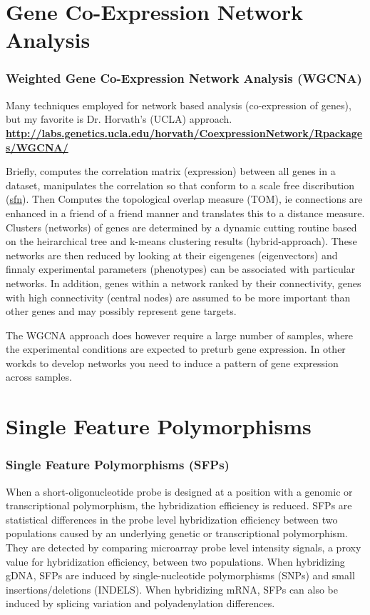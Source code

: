 \documentclass[pdf]{beamer}
\begin{document}
\section{Gene Co-Expression Network Analysis}

\begin{frame}[allowframebreaks]
	\frametitle{Weighted Gene Co-Expression Network Analysis (WGCNA)}

Many techniques employed for network based analysis (co-expression of genes), but my favorite is Dr. Horvath's (UCLA) approach.\\
\textbf{\url{http://labs.genetics.ucla.edu/horvath/CoexpressionNetwork/Rpackages/WGCNA/}}
\vspace{0.1in}

Briefly, computes the correlation matrix (expression) between all genes in a dataset, manipulates the correlation so that conform to a scale free discribution (\href{http://en.wikipedia.org/wiki/File:Scale-free_network_sample.png}{sfn}). Then Computes the topological overlap measure (TOM), ie connections are enhanced in a friend of a friend manner and translates this to a distance measure. Clusters (networks) of genes are determined by a dynamic cutting routine based on the heirarchical tree and k-means clustering results (hybrid-approach). These networks are then reduced by looking at their eigengenes (eigenvectors) and finnaly experimental parameters (phenotypes) can be associated with particular networks. In addition, genes within a network ranked by their connectivity, genes with high connectivity (central nodes) are assumed to be more important than other genes and may possibly represent gene targets.
\vspace{0.1in}

The WGCNA approach does however require a large number of samples, where the experimental conditions are expected to preturb gene expression. In other workds to develop networks you need to induce a pattern of gene expression across samples. 

\end{frame}

\section{Single Feature Polymorphisms}

\begin{frame}
\frametitle{Single Feature Polymorphisms (SFPs)}
When a short-oligonucleotide probe is designed at a position with a genomic or transcriptional polymorphism, the hybridization efficiency is reduced. SFPs are statistical differences in the probe level hybridization efficiency between two populations caused by an underlying genetic or transcriptional polymorphism. They are detected by comparing microarray probe level intensity signals, a proxy value for hybridization efficiency, between two populations. When hybridizing gDNA, SFPs are induced by single-nucleotide polymorphisms (SNPs) and small insertions/deletions (INDELS). When hybridizing mRNA, SFPs can also be induced by splicing variation and polyadenylation differences. 
\end{frame}
\end{document}
